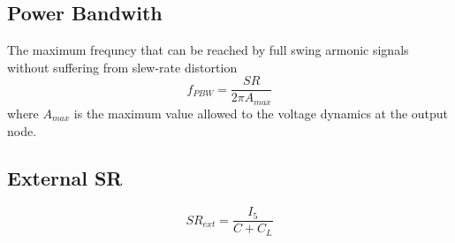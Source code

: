 \subsection{Power Bandwith}
The maximum frequncy that can be reached by full swing armonic signals without suffering from slew-rate distortion
\begin{equation}
f_{PBW}=\frac{SR}{2\pi A_{max}}
\end{equation}
where $A_{max}$ is the maximum value allowed to the voltage dynamics at the output node.\\

\subsection{External SR}
\begin{equation}
SR_{ext}=\frac{I_5}{C+C_L}
\end{equation}











